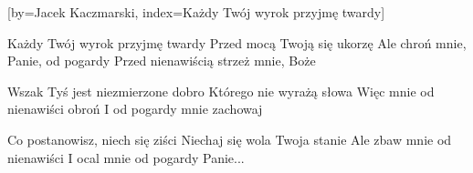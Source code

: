 [by={Jacek Kaczmarski},
                     index={Każdy Twój wyrok przyjmę twardy}]
\beginverse

Każdy Twój wyrok przyjmę twardy
Przed mocą Twoją się ukorzę
Ale chroń mnie, Panie, od pogardy
Przed nienawiścią strzeż mnie, Boże

\endverse
\beginverse

Wszak Tyś jest niezmierzone dobro
Którego nie wyrażą słowa
Więc mnie od nienawiści obroń
I od pogardy mnie zachowaj

\endverse
\beginverse

Co postanowisz, niech się ziści
Niechaj się wola Twoja stanie
Ale zbaw mnie od nienawiści
I ocal mnie od pogardy Panie...

\endverse
\endsong
